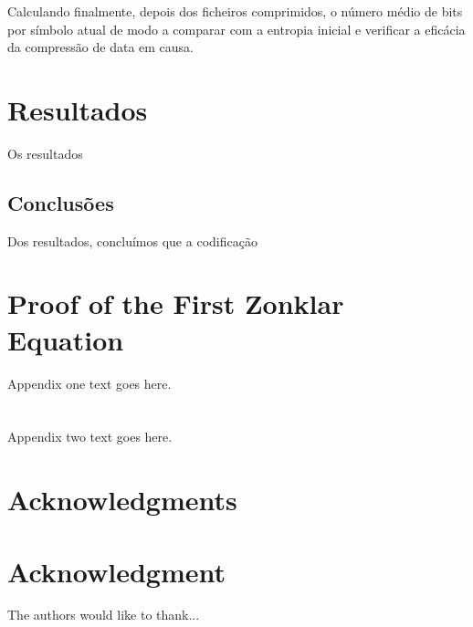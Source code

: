 \documentclass[12pt,journal,compsoc]{IEEEtran}
\begin{document}
Calculando finalmente, depois dos ficheiros comprimidos, o número médio de bits por símbolo atual de modo a comparar com a entropia inicial e verificar a eficácia da compressão de data em causa.

\section{Resultados} %
Os resultados 



\subsection{Conclusões}
Dos resultados, concluímos que a codificação



\appendices
\section{Proof of the First Zonklar Equation}
Appendix one text goes here.

\section{}
Appendix two text goes here.


\ifCLASSOPTIONcompsoc
  \section*{Acknowledgments}
\else
  \section*{Acknowledgment}
\fi

The authors would like to thank...

\ifCLASSOPTIONcaptionsoff
  \newpage
\fi


\footnotemark 


\end{document}
